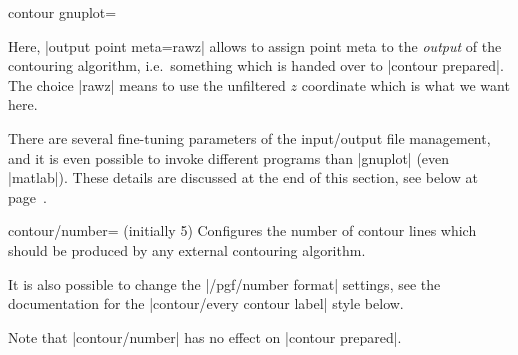 {{\begin{plottype}[/pgfplots]{contour gnuplot=\textcolor{black}{}}
\begin{codeexample}[]
%
\end{codeexample}
	
	Here, |output point meta=rawz| allows to assign point meta to the \emph{output} of the contouring algorithm, i.e.\ something which is handed over to |contour prepared|. The choice |rawz| means to use the unfiltered $z$ coordinate which is what we want here.


	There are several fine-tuning parameters of the input/output file management, and it is even possible to invoke different programs than |gnuplot| (even |matlab|). These details are discussed at the end of this section, see below at page~\pageref{key:pgfplots:contour:gnuplot}.
\end{plottype}

\begin{pgfplotskey}{contour/number= (initially 5)}
	Configures the number of contour lines which should be produced by any external contouring algorithm.	
\pgfplotsexpensiveexample
\begin{codeexample}[]
\end{codeexample}
	It is also possible to change the |/pgf/number format| settings, see the documentation for the |contour/every contour label| style below.


	Note that |contour/number| has no effect on |contour prepared|.
\end{pgfplotskey}

}}
